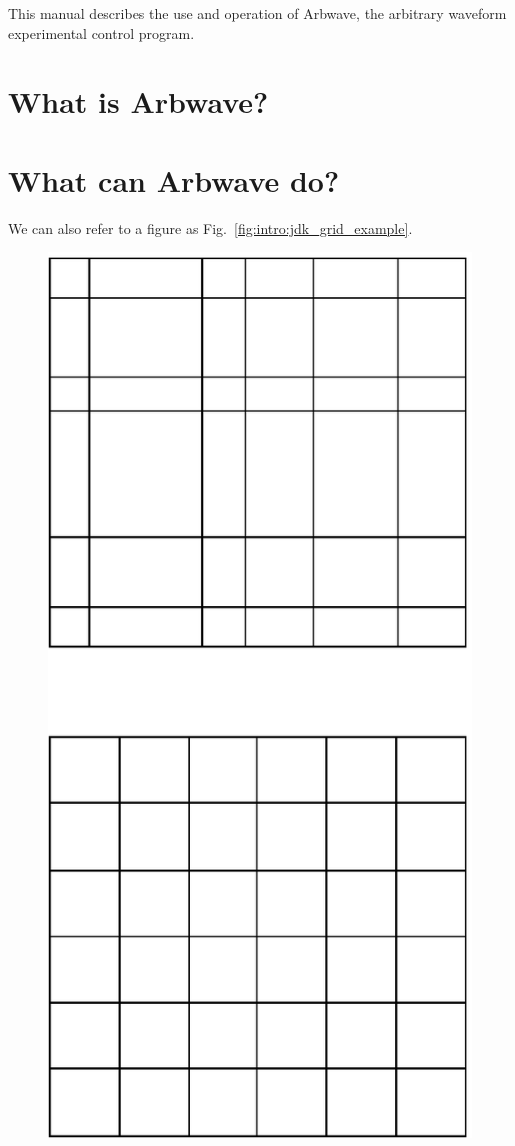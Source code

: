 This manual describes the use and operation of Arbwave, the arbitrary waveform
experimental control program.

\section{What is Arbwave?}

\section{What can Arbwave do?}

We can also refer to a figure as Fig.~\ref{fig:intro:jdk_grid_example}.

\begin{figure}[hb]
    \centerline{\includegraphics[angle=-90]{figures/jdk_grid_example}}

\end{figure}
